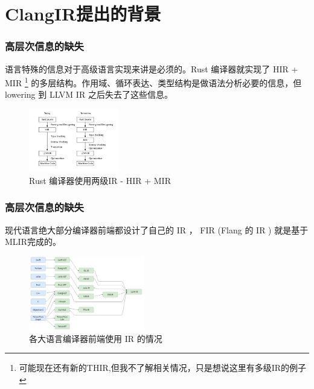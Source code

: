 \section{ClangIR提出的背景}

\begin{frame}
    \frametitle{高层次信息的缺失}
    语言特殊的信息对于高级语言实现来讲是必须的。Rust 编译器就实现了 HIR + MIR
    \footnote{可能现在还有新的THIR,但我不了解相关情况，只是想说这里有多级IR的例子}
    的多层结构。作用域、循环表达、类型结构是做语法分析必要的信息，但
    lowering 到 LLVM IR 之后失去了这些信息。

    \begin{figure}
        \centering
        \includegraphics[width=0.35\textwidth]{images/rust-flow.png}
        \caption{Rust 编译器使用两级IR - HIR + MIR\cite{rustir}}
    \end{figure}

\end{frame}

\begin{frame}
    \frametitle{高层次信息的缺失}
    现代语言绝大部分编译器前端都设计了自己的 IR ， FIR (Flang 的 IR ) 就是基于
    MLIR完成的。
    \begin{figure}[h]
        \centering
        \includegraphics[width=0.45\textwidth]{images/compiler-ir.png}
        \caption{各大语言编译器前端使用 IR 的情况}
    \end{figure}

\end{frame}


